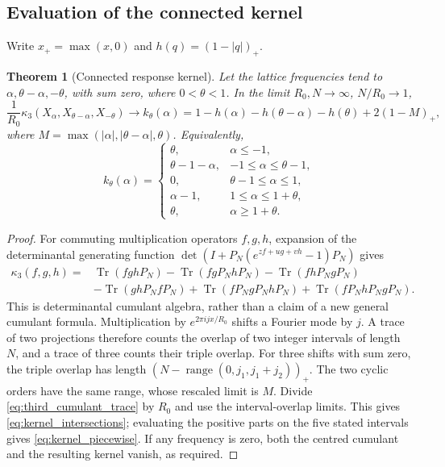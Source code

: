 \documentclass[11pt,reqno]{amsart}
\theoremstyle{plain}\newtheorem{theorem}{Theorem}[section]\newtheorem{proposition}[theorem]{Proposition}\newtheorem{lemma}[theorem]{Lemma}\newtheorem{corollary}[theorem]{Corollary}
\theoremstyle{definition}\newtheorem{hypothesis}[theorem]{Hypothesis}\newtheorem{definition}[theorem]{Definition}
\theoremstyle{remark}\newtheorem{remark}[theorem]{Remark}\newtheorem{experiment}[theorem]{Experiment}\newtheorem{question}[theorem]{Question}\newtheorem{heuristic}[theorem]{Heuristic}\newtheorem{conjecture}[theorem]{Conjecture}
\begin{document}
\subsection{Evaluation of the connected kernel}
\label{subsec:connected_kernel}
Write $x_+=\max(x,0)$ and $h(q)=(1-|q|)_+$.
\begin{theorem}[Connected response kernel]\label{thm:sine_kernel}
Let the lattice frequencies tend to $\alpha,\theta-\alpha,-\theta$, with sum zero, where $0<\theta<1$. In the limit $R_0,N\to\infty$, $N/R_0\to1$,
\begin{equation}
 \frac1{R_0}\kappa_3(X_\alpha,X_{\theta-\alpha},X_{-\theta})
 \longrightarrow k_\theta(\alpha)
 =1-h(\alpha)-h(\theta-\alpha)-h(\theta)
       +2(1-M)_+,
 \label{eq:kernel_intersections}
\end{equation}
where $M=\max(|\alpha|,|\theta-\alpha|,\theta)$. Equivalently,
\begin{equation}
 k_\theta(\alpha)=
 \begin{cases}
 \theta,&\alpha\le-1,\\
 \theta-1-\alpha,&-1\le\alpha\le\theta-1,\\
 0,&\theta-1\le\alpha\le1,\\
 \alpha-1,&1\le\alpha\le1+\theta,\\
 \theta,&\alpha\ge1+\theta.
 \end{cases}
 \label{eq:kernel_piecewise}
\end{equation}
\end{theorem}
\begin{proof}
For commuting multiplication operators $f,g,h$, expansion of the determinantal generating function $\det(I+P_N(e^{zf+ug+vh}-1)P_N)$ gives
\begin{equation}
 \begin{split}
 \kappa_3(f,g,h)={}&\operatorname{Tr}(fghP_N)
 -\operatorname{Tr}(fgP_NhP_N)-\operatorname{Tr}(fhP_NgP_N)\\
 &-\operatorname{Tr}(ghP_NfP_N)
 +\operatorname{Tr}(fP_NgP_NhP_N)
 +\operatorname{Tr}(fP_NhP_NgP_N).
 \end{split}
 \label{eq:third_cumulant_trace}
\end{equation}
This is determinantal cumulant algebra, rather than a claim of a new general cumulant formula. Multiplication by $e^{2\pi ijx/R_0}$ shifts a Fourier mode by $j$. A trace of two projections therefore counts the overlap of two integer intervals of length $N$, and a trace of three counts their triple overlap. For three shifts with sum zero, the triple overlap has length $(N-\operatorname{range}(0,j_1,j_1+j_2))_+$. The two cyclic orders have the same range, whose rescaled limit is $M$. Divide \eqref{eq:third_cumulant_trace} by $R_0$ and use the interval-overlap limits. This gives \eqref{eq:kernel_intersections}; evaluating the positive parts on the five stated intervals gives \eqref{eq:kernel_piecewise}. If any frequency is zero, both the centred cumulant and the resulting kernel vanish, as required.
\end{proof}
\end{document}
